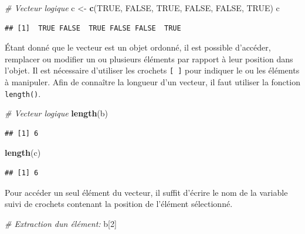 \documentclass[
]{book}
\newenvironment{Shaded}{\begin{snugshade}}{\end{snugshade}}
\newcommand{\CommentTok}[1]{\textcolor[rgb]{0.56,0.35,0.01}{\textit{#1}}}
\newcommand{\ConstantTok}[1]{\textcolor[rgb]{0.56,0.35,0.01}{#1}}
\newcommand{\DecValTok}[1]{\textcolor[rgb]{0.00,0.00,0.81}{#1}}
\newcommand{\FunctionTok}[1]{\textcolor[rgb]{0.13,0.29,0.53}{\textbf{#1}}}
\newcommand{\NormalTok}[1]{#1}
\newcommand{\OtherTok}[1]{\textcolor[rgb]{0.56,0.35,0.01}{#1}}
\begin{document}
\begin{Shaded}
\begin{Highlighting}[]
\CommentTok{\# Vecteur logique}
\NormalTok{c }\OtherTok{\textless{}{-}} \FunctionTok{c}\NormalTok{(}\ConstantTok{TRUE}\NormalTok{, }\ConstantTok{FALSE}\NormalTok{, }\ConstantTok{TRUE}\NormalTok{, }\ConstantTok{FALSE}\NormalTok{, }\ConstantTok{FALSE}\NormalTok{, }\ConstantTok{TRUE}\NormalTok{)}
\NormalTok{c}
\end{Highlighting}
\end{Shaded}

\begin{verbatim}
## [1]  TRUE FALSE  TRUE FALSE FALSE  TRUE
\end{verbatim}

Étant donné que le vecteur est un objet ordonné, il est possible d'accéder, remplacer ou modifier un ou plusieurs éléments par rapport à leur position dans l'objet. Il est nécessaire d'utiliser les crochets \texttt{{[}\ {]}} pour indiquer le ou les éléments à manipuler. Afin de connaître la longueur d'un vecteur, il faut utiliser la fonction \texttt{length()}.

\begin{Shaded}
\begin{Highlighting}[]
\CommentTok{\# Vecteur logique}
\FunctionTok{length}\NormalTok{(b)}
\end{Highlighting}
\end{Shaded}

\begin{verbatim}
## [1] 6
\end{verbatim}

\begin{Shaded}
\begin{Highlighting}[]
\FunctionTok{length}\NormalTok{(c)}
\end{Highlighting}
\end{Shaded}

\begin{verbatim}
## [1] 6
\end{verbatim}

Pour accéder un seul élément du vecteur, il suffit d'écrire le nom de la variable suivi de crochets contenant la position de l'élément sélectionné.

\begin{Shaded}
\begin{Highlighting}[]
\CommentTok{\# Extraction d\textquotesingle{}un élément:}
\NormalTok{b[}\DecValTok{2}\NormalTok{]}
\end{Highlighting}
\end{Shaded}
\end{document}
